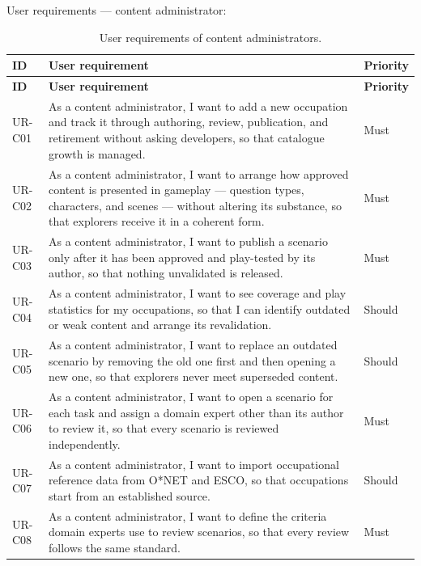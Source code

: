 User requirements --- content administrator:

{\small
\begin{longtable}{|>{\raggedright\arraybackslash}p{}|>{\raggedright\arraybackslash}p{}|>{\raggedright\arraybackslash}p{}|}
\caption{User requirements of content administrators.} \\
\hline
\textbf{ID} & \textbf{User requirement} & \textbf{Priority} \\ \hline
\endfirsthead
\hline
\textbf{ID} & \textbf{User requirement} & \textbf{Priority} \\ \hline
\endhead
UR-C01 & As a content administrator, I want to add a new occupation and track it through authoring, review, publication, and retirement without asking developers, so that catalogue growth is managed. & Must \\ \hline
UR-C02 & As a content administrator, I want to arrange how approved content is presented in gameplay --- question types, characters, and scenes --- without altering its substance, so that explorers receive it in a coherent form. & Must \\ \hline
UR-C03 & As a content administrator, I want to publish a scenario only after it has been approved and play-tested by its author, so that nothing unvalidated is released. & Must \\ \hline
UR-C04 & As a content administrator, I want to see coverage and play statistics for my occupations, so that I can identify outdated or weak content and arrange its revalidation. & Should \\ \hline
UR-C05 & As a content administrator, I want to replace an outdated scenario by removing the old one first and then opening a new one, so that explorers never meet superseded content. & Should \\ \hline
UR-C06 & As a content administrator, I want to open a scenario for each task and assign a domain expert other than its author to review it, so that every scenario is reviewed independently. & Must \\ \hline
UR-C07 & As a content administrator, I want to import occupational reference data from O*NET and ESCO, so that occupations start from an established source. & Should \\ \hline
UR-C08 & As a content administrator, I want to define the criteria domain experts use to review scenarios, so that every review follows the same standard. & Must \\ \hline
\end{longtable}
}

